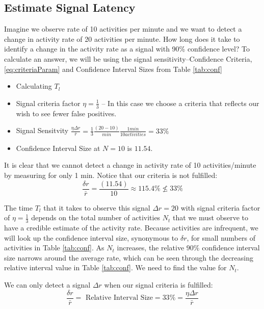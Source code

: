 \documentclass{article}
\begin{document}
   
\subsection{Estimate Signal Latency} 
\label{ex:2}

Imagine we observe rate of 10 activities per minute and we want to detect a change in activity rate of 20 activities
per minute.  How long does it take to identify a change in the activity rate as a signal with 90\% confidence level? 
To calculate an answer, we will be using the signal sensitivity--Confidence Criteria, \ref{eq:criteriaParam} and 
Confidence Interval Sizes from Table \ref{tab:conf}

\begin{itemize}
\item Calculating $T_{l}$
\item Signal criteria factor $\eta=\frac{1}{3}$ -- In this case we choose a criteria that reflects our wish to see fewer false positives.
\item Signal Sensitvity $\frac{\eta \Delta r}{\bar{r}} = \frac{1}{3}\frac{(20-10)}{min} \frac{1 min}{10 activities}= 33\%$
\item Confidence Interval Size at $N =10$ is $11.54$. %
\end{itemize}

It is clear that we cannot detect a change in activity rate of 10 activities/minute by measuring for only 1 min.  Notice that our criteria is not fulfilled:
\begin{equation}
    \label{eq:ex2:notmet}
    \frac{\delta r}{\bar{r}} = \frac{(11.54)}{10} \approx 115.4\% \not\le 33\% 
\end{equation}

The time $T_{l}$ that it takes to observe this signal $\Delta r =20$ with signal criteria factor of $\eta=\frac{1}{3}$ depends 
on the total number of activities $N_t$ that we must observe to have a credible estimate of the activity rate. Because activities 
are infrequent, we will look up the confidence interval size, synonymous to $\delta r$, for small numbers of activities 
in Table \ref{tab:conf}.  As $N_t$ increases, the relative $90\%$ confidence interval size narrows around the 
average rate, which can be seen through the decreasing relative interval value in Table \ref{tab:conf}.  We need to 
find the value for $N_t$.

We can only detect a signal $\Delta r$ when our signal criteria is fulfilled:
\begin{equation}
    \label{eq:ex2:met}
    \frac{\delta r}{\bar{r}} = \text{ Relative Interval Size} = 33\% =  \frac{\eta \Delta r}{\bar{r}}
\end{equation}
\end{document}

